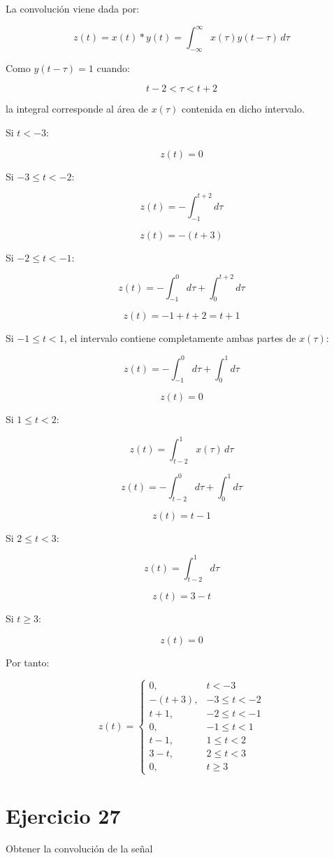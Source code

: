 \documentclass[fleqn]{article}
\begin{document}
	La convolución viene dada por:

	\[
	z(t)
	=
	x(t)*y(t)
	=
	\int_{-\infty}^{\infty}
	x(\tau)y(t-\tau)\,d\tau
	\]

	Como $y(t-\tau)=1$ cuando:

	\[
	t-2<\tau<t+2
	\]

	la integral corresponde al área de $x(\tau)$ contenida en dicho intervalo.

	Si $t<-3$:

	\[
	z(t)=0
	\]

	Si $-3\leq t<-2$:

	\[
	z(t)
	=
	-\int_{-1}^{t+2}d\tau
	\]

	\[
	z(t)=-(t+3)
	\]

	Si $-2\leq t<-1$:

	\[
	z(t)
	=
	-\int_{-1}^{0}d\tau
	+
	\int_0^{t+2}d\tau
	\]

	\[
	z(t)
	=
	-1+t+2
	=
	t+1
	\]

	Si $-1\leq t<1$, el intervalo contiene completamente ambas partes de $x(\tau)$:

	\[
	z(t)
	=
	-\int_{-1}^{0}d\tau
	+
	\int_0^1d\tau
	\]

	\[
	z(t)=0
	\]

	Si $1\leq t<2$:

	\[
	z(t)
	=
	\int_{t-2}^{1}x(\tau)\,d\tau
	\]

	\[
	z(t)
	=
	-\int_{t-2}^{0}d\tau
	+
	\int_0^1d\tau
	\]

	\[
	z(t)=t-1
	\]

	Si $2\leq t<3$:

	\[
	z(t)
	=
	\int_{t-2}^{1}d\tau
	\]

	\[
	z(t)=3-t
	\]

	Si $t\geq3$:

	\[
	z(t)=0
	\]

	Por tanto:

	\[
	\boxed{
	z(t)=
	\begin{cases}
	0, & t<-3 \\[1mm]
	-(t+3), & -3\leq t<-2 \\[1mm]
	t+1, & -2\leq t<-1 \\[1mm]
	0, & -1\leq t<1 \\[1mm]
	t-1, & 1\leq t<2 \\[1mm]
	3-t, & 2\leq t<3 \\[1mm]
	0, & t\geq3
	\end{cases}
	}
	\]

\section{Ejercicio 27}
	Obtener la convolución de la señal
\end{document}
